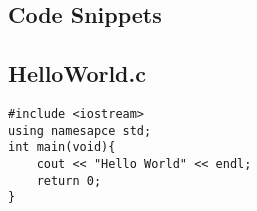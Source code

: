 \begin{appendices}

\chapter{Code Snippets}
\section{HelloWorld.c}
\begin{verbatim}
#include <iostream>
using namesapce std;
int main(void){
    cout << "Hello World" << endl;
    return 0;
}
\end{verbatim}

\end{appendices}
